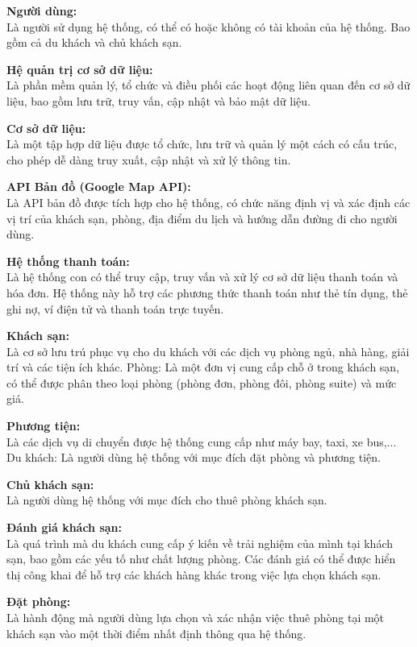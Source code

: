 \textbf{Người dùng:}\\
\indent
Là người sử dụng hệ thống, có thể có hoặc không có tài khoản của hệ thống. Bao gồm cả du khách và chủ khách sạn.

\textbf{Hệ quản trị cơ sở dữ liệu:}\\
\indent
Là phần mềm quản lý, tổ chức và điều phối các hoạt động liên quan đến cơ sở dữ liệu, bao gồm lưu trữ, truy vấn, cập nhật và bảo mật dữ liệu.

\textbf{Cơ sở dữ liệu:}\\
\indent Là một tập hợp dữ liệu được tổ chức, lưu trữ và quản lý một cách có cấu trúc, cho phép dễ dàng truy xuất, cập nhật và xử lý thông tin.

\textbf{API Bản đồ (Google Map API): }\\
\indent Là API bản đồ được tích hợp cho hệ thống, có chức năng định vị và xác định các vị trí của khách sạn, phòng, địa điểm du lịch và hướng dẫn đường đi cho người dùng.

\textbf{Hệ thống thanh toán:}\\
\indent Là hệ thống con có thể truy cập, truy vấn và xử lý cơ sở dữ liệu thanh toán và hóa đơn. Hệ thống này hỗ trợ các phương thức thanh toán như thẻ tín dụng, thẻ ghi nợ, ví điện tử và thanh toán trực tuyến.

\textbf{Khách sạn: }\\
\indent Là cơ sở lưu trú phục vụ cho du khách với các dịch vụ phòng ngủ, nhà hàng, giải trí và các tiện ích khác.
Phòng: Là một đơn vị cung cấp chỗ ở trong khách sạn, có thể được phân theo loại phòng (phòng đơn, phòng đôi, phòng suite) và mức giá.

\textbf{Phương tiện: }\\
\indent Là các dịch vụ di chuyển được hệ thống cung cấp như máy bay, taxi, xe bus,...
Du khách: Là người dùng hệ thống với mục đích đặt phòng và phương tiện.

\textbf{Chủ khách sạn: }\\
\indent Là người dùng hệ thống với mục đích cho thuê phòng khách sạn.

\textbf{Đánh giá khách sạn: }\\
\indent Là quá trình mà du khách cung cấp ý kiến về trải nghiệm của mình tại khách sạn, bao gồm các yếu tố như chất lượng phòng. Các đánh giá có thể được hiển thị công khai để hỗ trợ các khách hàng khác trong việc lựa chọn khách sạn.

\textbf{Đặt phòng: }\\
\indent Là hành động mà người dùng lựa chọn và xác nhận việc thuê phòng tại một khách sạn vào một thời điểm nhất định thông qua hệ thống.

